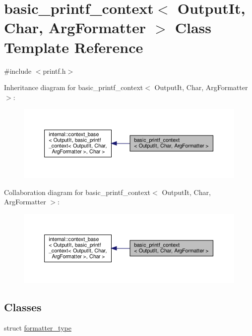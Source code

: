 \hypertarget{classbasic__printf__context}{}\section{basic\+\_\+printf\+\_\+context$<$ Output\+It, Char, Arg\+Formatter $>$ Class Template Reference}
\label{classbasic__printf__context}


{\ttfamily \#include $<$printf.\+h$>$}



Inheritance diagram for basic\+\_\+printf\+\_\+context$<$ Output\+It, Char, Arg\+Formatter $>$\+:
\nopagebreak
\begin{figure}[H]
\begin{center}
\leavevmode
\includegraphics[width=350pt]{classbasic__printf__context__inherit__graph}
\end{center}
\end{figure}


Collaboration diagram for basic\+\_\+printf\+\_\+context$<$ Output\+It, Char, Arg\+Formatter $>$\+:
\nopagebreak
\begin{figure}[H]
\begin{center}
\leavevmode
\includegraphics[width=350pt]{classbasic__printf__context__coll__graph}
\end{center}
\end{figure}
\subsection*{Classes}
\begin{DoxyCompactItemize}
\item 
struct \hyperlink{structbasic__printf__context_1_1formatter__type}{formatter\+\_\+type}
\end{DoxyCompactItemize}
